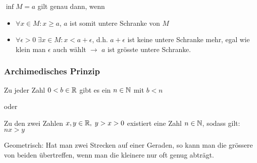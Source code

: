 $\inf M = a$ gilt genau dann, wenn
\begin{itemize}
	\item $\forall x \in M: x \geq a$, $a$ ist somit untere Schranke von $M$
	\item $\forall \epsilon > 0 \; \exists x \in M: x < a + \epsilon$, d.h. $a + \epsilon$ ist keine untere Schranke mehr, egal wie klein man $\epsilon$ auch wählt $\rightarrow$ $a$ ist grösste untere Schranke.
\end{itemize}

\subsubsection{Archimedisches Prinzip}
\begin{satz}
Zu jeder Zahl $0 < b \in \mathbb{R}$ gibt es ein $n \in \mathbb{N}$ mit $b < n$
\end{satz}

oder

\begin{satz}
Zu den zwei Zahlen $x, y \in \mathbb{R}, \; y > x > 0$ existiert eine Zahl $n \in \mathbb{N}$, sodass gilt: $nx > y$
\end{satz}

Geometrisch: Hat man zwei Strecken auf einer Geraden, so kann man die grössere von beiden übertreffen, wenn man die kleinere nur oft genug abträgt.
